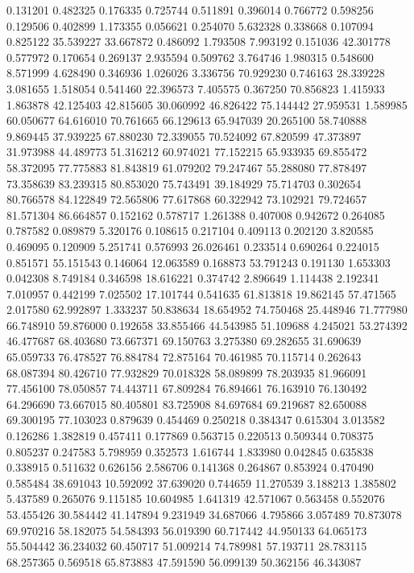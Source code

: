 0.131201
0.482325
0.176335
0.725744
0.511891
0.396014
0.766772
0.598256
0.129506
0.402899
1.173355
0.056621
0.254070
5.632328
0.338668
0.107094
0.825122
35.539227
33.667872
0.486092
1.793508
7.993192
0.151036
42.301778
0.577972
0.170654
0.269137
2.935594
0.509762
3.764746
1.980315
0.548600
8.571999
4.628490
0.346936
1.026026
3.336756
70.929230
0.746163
28.339228
3.081655
1.518054
0.541460
22.396573
7.405575
0.367250
70.856823
1.415933
1.863878
42.125403
42.815605
30.060992
46.826422
75.144442
27.959531
1.589985
60.050677
64.616010
70.761665
66.129613
65.947039
20.265100
58.740888
9.869445
37.939225
67.880230
72.339055
70.524092
67.820599
47.373897
31.973988
44.489773
51.316212
60.974021
77.152215
65.933935
69.855472
58.372095
77.775883
81.843819
61.079202
79.247467
55.288080
77.878497
73.358639
83.239315
80.853020
75.743491
39.184929
75.714703
0.302654
80.766578
84.122849
72.565806
77.617868
60.322942
73.102921
79.724657
81.571304
86.664857
0.152162
0.578717
1.261388
0.407008
0.942672
0.264085
0.787582
0.089879
5.320176
0.108615
0.217104
0.409113
0.202120
3.820585
0.469095
0.120909
5.251741
0.576993
26.026461
0.233514
0.690264
0.224015
0.851571
55.151543
0.146064
12.063589
0.168873
53.791243
0.191130
1.653303
0.042308
8.749184
0.346598
18.616221
0.374742
2.896649
1.114438
2.192341
7.010957
0.442199
7.025502
17.101744
0.541635
61.813818
19.862145
57.471565
2.017580
62.992897
1.333237
50.838634
18.654952
74.750468
25.448946
71.777980
66.748910
59.876000
0.192658
33.855466
44.543985
51.109688
4.245021
53.274392
46.477687
68.403680
73.667371
69.150763
3.275380
69.282655
31.690639
65.059733
76.478527
76.884784
72.875164
70.461985
70.115714
0.262643
68.087394
80.426710
77.932829
70.018328
58.089899
78.203935
81.966091
77.456100
78.050857
74.443711
67.809284
76.894661
76.163910
76.130492
64.296690
73.667015
80.405801
83.725908
84.697684
69.219687
82.650088
69.300195
77.103023
0.879639
0.454469
0.250218
0.384347
0.615304
3.013582
0.126286
1.382819
0.457411
0.177869
0.563715
0.220513
0.509344
0.708375
0.805237
0.247583
5.798959
0.352573
1.616744
1.833980
0.042845
0.635838
0.338915
0.511632
0.626156
2.586706
0.141368
0.264867
0.853924
0.470490
0.585484
38.691043
10.592092
37.639020
0.744659
11.270539
3.188213
1.385802
5.437589
0.265076
9.115185
10.604985
1.641319
42.571067
0.563458
0.552076
53.455426
30.584442
41.147894
9.231949
34.687066
4.795866
3.057489
70.873078
69.970216
58.182075
54.584393
56.019390
60.717442
44.950133
64.065173
55.504442
36.234032
60.450717
51.009214
74.789981
57.193711
28.783115
68.257365
0.569518
65.873883
47.591590
56.099139
50.362156
46.343087
